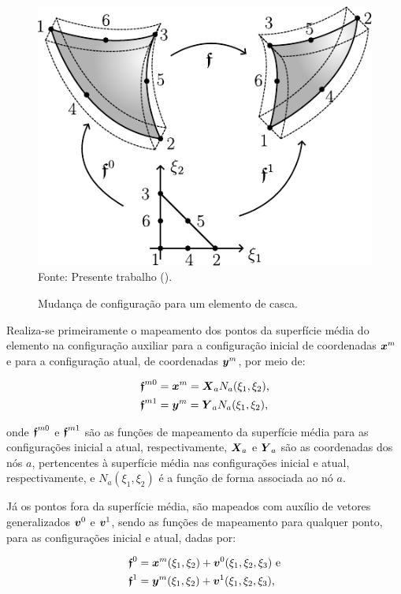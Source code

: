 \begin{figure}[h!]
    \centering
    \caption{Mudança de configuração para um elemento de casca.}
    \includegraphics[width=.4\linewidth]{Figuras/Mapeamento.pdf}
    \\Fonte: Presente trabalho (\the\year).
    \label{fig:Mapeamento}
\end{figure}

Realiza-se primeiramente o mapeamento dos pontos da superfície média do elemento na configuração auxiliar para a configuração inicial de coordenadas $\boldsymbol{x}^m$ e para a configuração atual, de coordenadas $\boldsymbol{y}^m$, por meio de:

\begin{subequations}
    \begin{align}
         & \boldsymbol{\mathfrak{f}}^{m0}=\boldsymbol{x}^m=\boldsymbol{X}_aN_a(\xi_1,\xi_2)\text{,} \\
         & \boldsymbol{\mathfrak{f}}^{m1}=\boldsymbol{y}^m=\boldsymbol{Y}_aN_a(\xi_1,\xi_2)\text{,}
    \end{align}
\end{subequations}

\noindent onde $\boldsymbol{\mathfrak{f}}^{m0}$ e $\boldsymbol{\mathfrak{f}}^{m1}$ são as funções de mapeamento da superfície média para as configurações inicial a atual, respectivamente, $\boldsymbol{X}_a$ e $\boldsymbol{Y}_a$ são as coordenadas dos nós $a$, pertencentes à superfície média nas configurações inicial e atual, respectivamente, e $N_a(\xi_1,\xi_2)$ é a função de forma associada ao nó $a$.

Já os pontos fora da superfície média, são mapeados com auxílio de vetores generalizados $\boldsymbol{v}^0$ e $\boldsymbol{v}^1$, sendo as funções de mapeamento para qualquer ponto, para as configurações inicial e atual, dadas por:

\begin{subequations}
    \begin{align}
         & \boldsymbol{\mathfrak{f}}^0=\boldsymbol{x}^m(\xi_1,\xi_2)+\boldsymbol{v}^0(\xi_1,\xi_2,\xi_3)\text{ e} \\
         & \boldsymbol{\mathfrak{f}}^1=\boldsymbol{y}^m(\xi_1,\xi_2)+\boldsymbol{v}^1(\xi_1,\xi_2,\xi_3)\text{,}
    \end{align}
\end{subequations}

